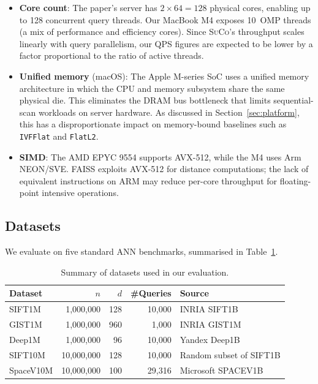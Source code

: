 \documentclass[11pt,a4paper]{article}
\newcommand{\suco}{\textsc{SuCo}}
\begin{document}
\begin{itemize}
  \item \textbf{Core count}: The paper's server has $2 \times 64 = 128$ physical
    cores, enabling up to 128 concurrent query threads.  Our MacBook M4 exposes
    10~OMP threads (a mix of performance and efficiency cores).  Since
    \suco{}'s throughput scales linearly with query parallelism, our QPS
    figures are expected to be lower by a factor proportional to the ratio
    of active threads.
  \item \textbf{Unified memory} (macOS): The Apple M-series SoC uses a unified
    memory architecture in which the CPU and memory subsystem share the same
    physical die.  This eliminates the DRAM bus bottleneck that limits
    sequential-scan workloads on server hardware.  As discussed in
    Section~\ref{sec:platform}, this has a disproportionate impact on
    memory-bound baselines such as \texttt{IVFFlat} and \texttt{FlatL2}.
  \item \textbf{SIMD}: The AMD EPYC 9554 supports AVX-512, while the M4 uses
    Arm NEON/SVE.  FAISS exploits AVX-512 for distance computations; the lack
    of equivalent instructions on ARM may reduce per-core throughput for
    floating-point intensive operations.
\end{itemize}

\subsection{Datasets}

We evaluate on five standard ANN benchmarks, summarised in
Table~\ref{tab:datasets}.

\begin{table}[H]
\centering
\caption{Summary of datasets used in our evaluation.}
\label{tab:datasets}
\begin{tabular}{lrrrl}
\toprule
Dataset & $n$ & $d$ & \#Queries & Source \\
\midrule
SIFT1M   & 1{,}000{,}000  & 128 & 10{,}000  & INRIA SIFT1B~\cite{jegou2011product} \\
GIST1M   & 1{,}000{,}000  & 960 &  1{,}000  & INRIA GIST1M \\
Deep1M   & 1{,}000{,}000  &  96 & 10{,}000  & Yandex Deep1B~\cite{babenko2016deep} \\
SIFT10M  & 10{,}000{,}000 & 128 & 10{,}000  & Random subset of SIFT1B \\
SpaceV10M & 10{,}000{,}000 & 100 & 29{,}316 & Microsoft SPACEV1B \\
\bottomrule
\end{tabular}
\end{table}
\end{document}
